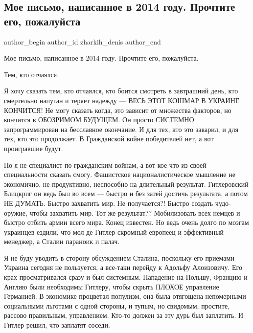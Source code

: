  
 
 
 
 
 
\subsection{Мое письмо, написанное в 2014 году. Прочтите его, пожалуйста}
\label{sec:05_08_2021.fb.zharkih_denis.1.pismo_2014}
 
\ifcmt
 author_begin
   author_id zharkih_denis
 author_end
\fi

Мое письмо, написанное в 2014 году. Прочтите его, пожалуйста. 

Тем, кто отчаялся.

Я хочу сказать тем, кто отчаялся, кто боится смотреть в завтрашний день, кто
смертельно напуган и  теряет надежду — ВЕСЬ ЭТОТ КОШМАР В УКРАИНЕ КОНЧИТСЯ! Не
могу сказать когда, это зависит от множества факторов, но кончится в ОБОЗРИМОМ
БУДУЩЕМ. Он просто СИСТЕМНО запрограммирован на бесславное окончание. И для
тех, кто это заварил, и для тех, кто это продолжает. В Гражданской войне
победителей нет, а вот проигравшие будут. 

Но я не специалист по гражданским войнам, а вот кое-что из своей специальности
сказать смогу. Фашистское националистическое мышление не экономично, не
продуктивно, неспособно на длительный результат. Гитлеровский Блицкриг он ведь
был во всем — быстро и без затей достичь результата, а потом НЕ ДУМАТЬ. Быстро
захватить мир. Не получается?! Быстро создать чудо-оружие, чтобы захватить мир.
Тот же результат?? Мобилизовать всех немцев и быстро отбить армии всего мира.
Конец известен. Но ведь очень долго по мозгам украинцев ездили, что мол-де
Гитлер скромный европеец и эффективный менеджер, а Сталин параноик и палач. 

Я не буду уводить в сторону обсуждением Сталина, поскольку его приемами Украина
сегодня не пользуется, а все-таки перейду к Адольфу Алоизовичу. Его крах
просматривался сразу и был системным. Нападение на Польшу, Францию и Англию
были необходимы Гитлеру, чтобы скрыть ПЛОХОЕ управление Германией. В экономике
процветал популизм, она была отягощена непомерными социальными льготами с одной
стороны, и тупым, но свидомым, простите, рассово правильным, управлением.
Кто-то должен за эту дурь был заплатить. И Гитлер решил, что заплатят соседи.  

